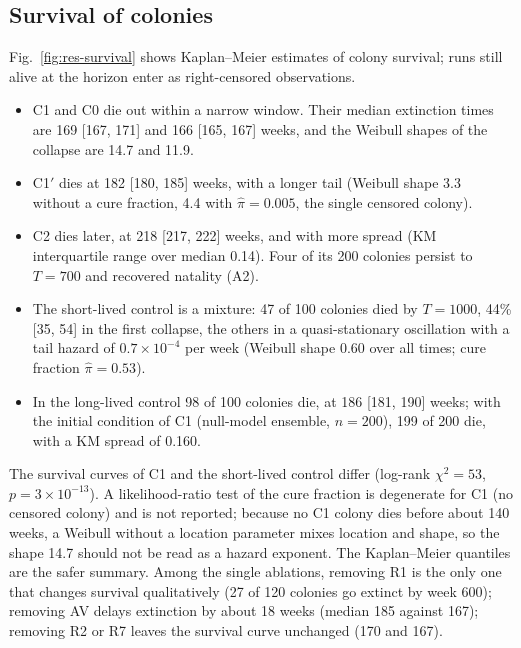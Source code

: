 \subsection{Survival of colonies}
\label{sec:res-survival}

Fig.~\ref{fig:res-survival} shows Kaplan--Meier estimates of colony survival; runs still alive at the horizon enter
as right-censored observations.
\begin{itemize}
  \item \textsf{C1} and \textsf{C0} die out within a narrow window. Their median extinction times are 169
    [167, 171] and 166 [165, 167] weeks, and the Weibull shapes of the collapse are 14.7 and 11.9.
  \item \textsf{C1}$'$ dies at 182 [180, 185] weeks, with a longer tail (Weibull shape 3.3 without a cure fraction,
    4.4 with $\hat\pi=0.005$, the single censored colony).
  \item \textsf{C2} dies later, at 218 [217, 222] weeks, and with more spread (KM interquartile range over median
    0.14). Four of its 200 colonies persist to $T=700$ and recovered natality (A2).
  \item The short-lived control is a mixture: 47 of 100 colonies died by $T=1000$, 44\% [35, 54] in the first
    collapse, the others in a quasi-stationary oscillation with a tail hazard of $0.7\times10^{-4}$ per week
    (Weibull shape 0.60 over all times; cure fraction $\hat\pi=0.53$).
  \item In the long-lived control 98 of 100 colonies die, at 186 [181, 190] weeks; with the
    initial condition of \textsf{C1} (null-model ensemble, $n=200$), 199 of 200 die, with a KM spread of 0.160.
\end{itemize}
The survival curves of \textsf{C1} and the short-lived control differ (log-rank $\chi^2=53$, $p=3\times10^{-13}$). A likelihood-ratio
test of the cure fraction is degenerate for \textsf{C1} (no censored colony) and is not reported; because no
\textsf{C1} colony dies before about 140 weeks, a Weibull without a location parameter mixes location and shape, so
the shape 14.7 should not be read as a hazard exponent. The Kaplan--Meier quantiles are the safer summary.
Among the single ablations, removing R1 is the only one that changes survival qualitatively (27 of 120 colonies go
extinct by week 600); removing AV delays extinction by about 18 weeks (median 185 against 167); removing R2 or R7
leaves the survival curve unchanged (170 and 167).

